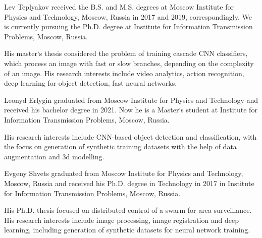 \begin{IEEEbiography}
{Lev Teplyakov}
received the B.S. and M.S. degrees at Moscow Institute for Physics and Technology, Moscow, Russia in 2017 and 2019, correspondingly.
We is currently pursuing the Ph.D. degree at Institute for Information Transmission Problems, Moscow, Russia.

His master`s thesis considered the problem of training cascade CNN classifiers, which process an image with fast or slow branches, depending on the complexity of an image.
His research interests include video analytics, action recognition, deep learning for object detection, fast neural networks.
\end{IEEEbiography}


\vfill
\begin{IEEEbiography}
    {Leonyd Erlygin}
graduated from Moscow Institute for Physics and Technology and received his bachelor degree in 2021.
Now he is a Master`s student at Institute for Information Transmission Problems, Moscow, Russia.

His research interests include CNN-based object detection and classification, with the focus on generation of synthetic training datasets with the help of data augmentation and 3d modelling.
\end{IEEEbiography}

\begin{IEEEbiography}
    {Evgeny Shvets}
graduated from Moscow Institute for Physics and Technology, Moscow, Russia and received his Ph.D. degree in Technology in 2017 in Institute for Information Transmission Problems, Moscow, Russia.

His Ph.D. thesis focused on distributed control of a swarm for area surveillance.
His research interests include image processing, image registration and deep learning, including generation of synthetic datasets for neural network training.
\end{IEEEbiography}
